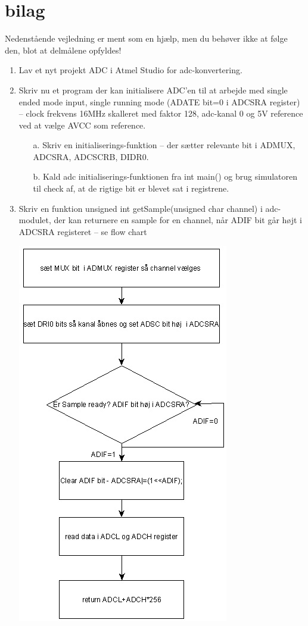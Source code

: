 \documentclass[a4paper,11pt]{article}
\theoremstyle{mytheor}
\begin{document}
\section{bilag}
Nedenstående vejledning er ment som en hjælp, men du behøver ikke at følge den, blot at delmålene opfyldes!
\begin{enumerate}
\subsection{lektion 10}
\item  {Lav et nyt projekt ADC i Atmel Studio for adc-konvertering.}
\item {Skriv nu et program der kan initialisere ADC’en til at arbejde med single ended mode input, single running mode (ADATE bit=0 i ADCSRA register) – clock frekvens 16MHz skalleret med faktor 128, adc-kanal 0 og 5V reference ved at vælge AVCC som reference.}
\begin{enumerate}
\item [a.] Skriv en initialiserings-funktion – der sætter relevante bit i ADMUX, ADCSRA, ADCSCRB, DIDR0.
\item [b.] Kald adc initialiserings-funktionen fra int main() og brug simulatoren til check af, at de rigtige bit er blevet sat i registrene.
\end{enumerate}
\item Skriv en funktion unsigned int getSample(unsigned char channel) i adc-modulet, der kan returnere en sample for en channel, når ADIF bit går højt i ADCSRA registeret – se flow chart 


\begin{center}

\includegraphics[scale=0.7]{adc_getSample}


\end{center}
\end{enumerate}
\end{document}
